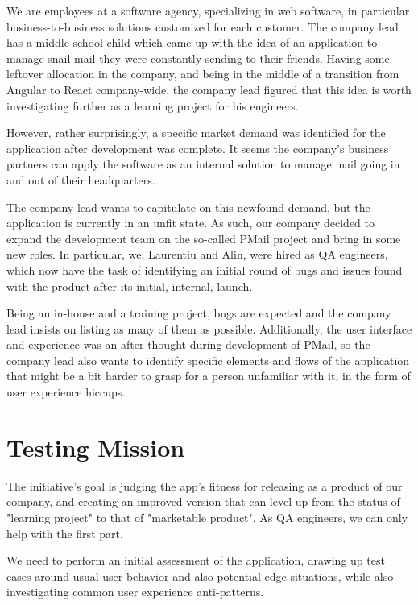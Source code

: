 \documentclass{article}
\begin{document}
We are employees at a software agency, specializing in web software, in particular business-to-business solutions customized for each customer. The company lead has a middle-school child which came up with the idea of an application to manage snail mail they were constantly sending to their friends. Having some leftover allocation in the company, and being in the middle of a transition from Angular to React company-wide, the company lead figured that this idea is worth investigating further as a learning project for his engineers.

However, rather surprisingly, a specific market demand was identified for the application after development was complete. It seems the company's business partners can apply the software as an internal solution to manage mail going in and out of their headquarters.

The company lead wants to capitulate on this newfound demand, but the application is currently in an unfit state. As such, our company decided to expand the development team on the so-called PMail project and bring in some new roles. In particular, we, Laurentiu and Alin, were hired as QA engineers, which now have the task of identifying an initial round of bugs and issues found with the product after its initial, internal, launch.

Being an in-house and a training project, bugs are expected and the company lead insists on listing as many of them as possible. Additionally, the user interface and experience was an after-thought during development of PMail, so the company lead also wants to identify specific elements and flows of the application that might be a bit harder to grasp for a person unfamiliar with it, in the form of user experience hiccups.

\section{Testing Mission}

The initiative's goal is judging the app's fitness for releasing as a product of our company, and creating an improved version that can level up from the status of "learning project" to that of "marketable product". As QA engineers, we can only help with the first part.

We need to perform an initial assessment of the application, drawing up test cases around usual user behavior and also potential edge situations, while also investigating common user experience anti-patterns.
\end{document}
